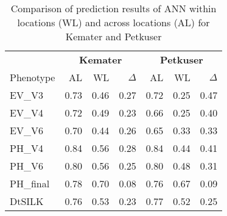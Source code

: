 \onehalfspacing
\begin{table}[H]
 \centering
 \caption[Comparison of prediction results of ANN within locations and across locations for Kemater and Petkuser]{Comparison of prediction results of ANN within locations (WL) and across locations (AL) for Kemater and Petkuser}
 \begin{tabular}{lrrr|rrr}
   \toprule
   & \multicolumn{3}{c}{\textbf{Kemater}} & \multicolumn{3}{c}{\textbf{Petkuser}}    \\
   Phenotype & AL                                   & WL   & $\Delta$ & AL   & WL   & $\Delta$ \\ 
   \midrule
   EV\_V3    & 0.73                                 & 0.46 & 0.27     & 0.72 & 0.25 & 0.47     \\ 
   EV\_V4    & 0.72                                 & 0.49 & 0.23     & 0.66 & 0.25 & 0.40     \\ 
   EV\_V6    & 0.70                                 & 0.44 & 0.26     & 0.65 & 0.33 & 0.33     \\ 
   PH\_V4    & 0.84                                 & 0.56 & 0.28     & 0.84 & 0.44 & 0.41     \\ 
   PH\_V6    & 0.80                                 & 0.56 & 0.25     & 0.80 & 0.48 & 0.31     \\ 
   PH\_final & 0.78                                 & 0.70 & 0.08     & 0.76 & 0.67 & 0.09     \\ 
   DtSILK    & 0.76                                 & 0.53 & 0.23     & 0.77 & 0.52 & 0.25     \\ 
   \bottomrule
 \end{tabular}
\end{table}
\doublespacing

